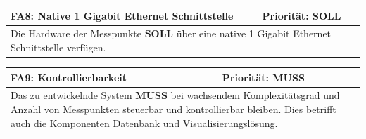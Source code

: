 \documentclass[titlepage]{report}
\begin{document}
\begin{center}
\begin{tabular}{p{}>{\raggedleft\arraybackslash}p{}}\toprule
    \textbf{FA8: Native 1 Gigabit Ethernet Schnittstelle} & \textbf{Priorität: SOLL} \\\midrule
	\multicolumn{2}{p{\textwidth-\tabcolsep}}{%
    Die Hardware der Messpunkte \textbf{SOLL} über eine native 1 Gigabit
    Ethernet Schnittstelle verfügen.
    }\\\bottomrule
\end{tabular}
    \label{table:FA8}
\end{center}
\begin{center}
\begin{tabular}{p{}>{\raggedleft\arraybackslash}p{}}\toprule
    \textbf{FA9: Kontrollierbarkeit} & \textbf{Priorität: MUSS} \\\midrule
	\multicolumn{2}{p{\textwidth-\tabcolsep}}{%
        Das zu entwickelnde System \textbf{MUSS} bei wachsendem
        Komplexitätsgrad und Anzahl von Messpunkten steuerbar und
        kontrollierbar bleiben. Dies betrifft auch die Komponenten
        Datenbank und Visualisierungslösung.
        }\\\bottomrule
\end{tabular}
    \label{table:FA9}
\end{center}
\end{document}
